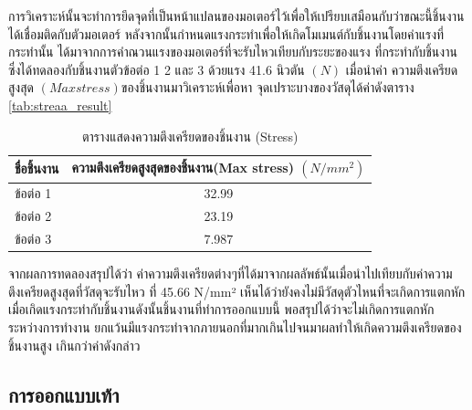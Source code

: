 \vspace{-15pt}
การวิเคราะห์นั้นจะทำการยึดจุดที่เป็นหน้าแปลนของมอเตอร์ไว้เพื่อให้เปรียบเสมือนกับว่าขณะนี้ชิ้นงาน
ได้เชื่อมติดกับตัวมอเตอร์ หลังจากนั้นกำหนดแรงกระทำเพื่อให้เกิดโมเมนต์กับชิ้นงานโดยค่าแรงที่กระทำนั้น
ได้มาจากการคำณวนแรงของมอเตอร์ที่จะรับไหวเทียบกับระยะของแรง ที่กระทำกับชิ้นงาน 
ซึ่งได้ทดลองกับชิ้นงานตัวข้อต่อ 1 2 และ 3 ด้วยแรง 41.6 นิวตัน $(N)$
เมื่อนำค่า ความตึงเครียดสูงสุด $(Max stress)$ของชิ้นงานมาวิเคราะห์เพื่อหา จุดเปราะบางของวัสดุได้ค่าดังตาราง
\ref{tab:streaa_result}
\begin{table}[ht]
	\centering
	\begin{tabular}{| l | c |}
		\hline
		ชื่อชิ้นงาน	& ความตึงเครียดสูงสุดของชิ้นงาน(Max stress) $(N/mm^2)$ \\
        \hline
        ข้อต่อ 1 & 32.99 \\
        ข้อต่อ 2 & 23.19 \\
        ข้อต่อ 3 & 7.987 \\
	    \hline
	\end{tabular}
	\caption{ตารางแสดงความตึงเครียดของชิ้นงาน (Stress)}
	\label{tab:stress_result}
\end{table}
\vspace{-15pt}
จากผลการทดลองสรุปได้ว่า ค่าความตึงเครียดต่างๆที่ได้มาจากผลลัพธ์นั้นเมื่อนำไปเทียบกับค่าความตึงเครียดสูงสุดที่วัสดุจะรับไหว
ที่ 45.66 N/mm² เห็นได้ว่ายังคงไม่มีวัสดุตัวไหนที่จะเกิดการแตกหักเมื่อเกิดแรงกระทำกับชิ้นงานดังนั้นชิ้นงานที่ทำการออกแบบนี้
พอสรุปได้ว่าจะไม่เกิดการแตกหักระหว่างการทำงาน ยกแว้นมีแรงกระทำจากภายนอกที่มากเกินไปจนมาผลทำให้เกิดความตึงเครียดของชิ้นงานสูง
เกินกว่าค่าดังกล่าว  

\clearpage
\subsection{การออกแบบเท้า}
